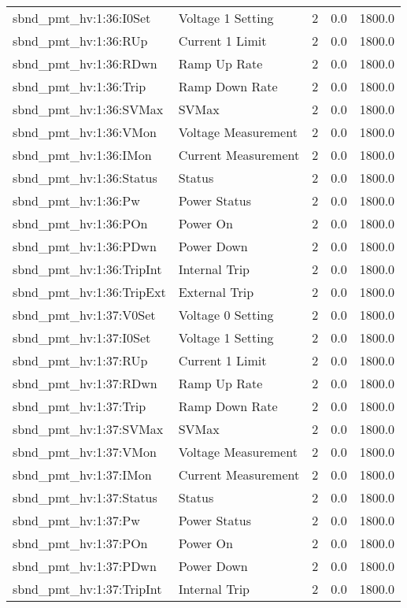 \begin{center}
\begin{longtable}{l | l l l l }
sbnd\_pmt\_hv:1:36:I0Set & Voltage 1 Setting & 2 & 0.0 & 1800.0\\ 
sbnd\_pmt\_hv:1:36:RUp & Current 1 Limit & 2 & 0.0 & 1800.0\\ 
sbnd\_pmt\_hv:1:36:RDwn & Ramp Up Rate & 2 & 0.0 & 1800.0\\ 
sbnd\_pmt\_hv:1:36:Trip & Ramp Down Rate & 2 & 0.0 & 1800.0\\ 
sbnd\_pmt\_hv:1:36:SVMax & SVMax & 2 & 0.0 & 1800.0\\ 
sbnd\_pmt\_hv:1:36:VMon & Voltage Measurement & 2 & 0.0 & 1800.0\\ 
sbnd\_pmt\_hv:1:36:IMon & Current Measurement & 2 & 0.0 & 1800.0\\ 
sbnd\_pmt\_hv:1:36:Status & Status & 2 & 0.0 & 1800.0\\ 
sbnd\_pmt\_hv:1:36:Pw & Power Status & 2 & 0.0 & 1800.0\\ 
sbnd\_pmt\_hv:1:36:POn & Power On & 2 & 0.0 & 1800.0\\ 
sbnd\_pmt\_hv:1:36:PDwn & Power Down & 2 & 0.0 & 1800.0\\ 
sbnd\_pmt\_hv:1:36:TripInt & Internal Trip & 2 & 0.0 & 1800.0\\ 
sbnd\_pmt\_hv:1:36:TripExt & External Trip & 2 & 0.0 & 1800.0\\ 
sbnd\_pmt\_hv:1:37:V0Set & Voltage 0 Setting & 2 & 0.0 & 1800.0\\ 
sbnd\_pmt\_hv:1:37:I0Set & Voltage 1 Setting & 2 & 0.0 & 1800.0\\ 
sbnd\_pmt\_hv:1:37:RUp & Current 1 Limit & 2 & 0.0 & 1800.0\\ 
sbnd\_pmt\_hv:1:37:RDwn & Ramp Up Rate & 2 & 0.0 & 1800.0\\ 
sbnd\_pmt\_hv:1:37:Trip & Ramp Down Rate & 2 & 0.0 & 1800.0\\ 
sbnd\_pmt\_hv:1:37:SVMax & SVMax & 2 & 0.0 & 1800.0\\ 
sbnd\_pmt\_hv:1:37:VMon & Voltage Measurement & 2 & 0.0 & 1800.0\\ 
sbnd\_pmt\_hv:1:37:IMon & Current Measurement & 2 & 0.0 & 1800.0\\ 
sbnd\_pmt\_hv:1:37:Status & Status & 2 & 0.0 & 1800.0\\ 
sbnd\_pmt\_hv:1:37:Pw & Power Status & 2 & 0.0 & 1800.0\\ 
sbnd\_pmt\_hv:1:37:POn & Power On & 2 & 0.0 & 1800.0\\ 
sbnd\_pmt\_hv:1:37:PDwn & Power Down & 2 & 0.0 & 1800.0\\ 
sbnd\_pmt\_hv:1:37:TripInt & Internal Trip & 2 & 0.0 & 1800.0\\ 

\end{longtable}
\end{center}
